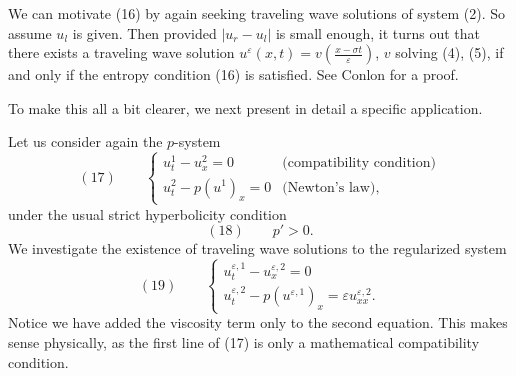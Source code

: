 We can motivate (16) by again seeking traveling wave solutions of system (2). So assume $u_l$ is given. Then provided $|u_r-u_l|$ is small enough, it turns out that there exists a traveling wave solution $u^\varepsilon(x,t) = v\left(\frac{x-\sigma t}{\varepsilon}\right)$, $v$ solving (4), (5), if and only if the entropy condition (16) is satisfied. See Conlon \cite{Conlon1980} for a proof.

To make this all a bit clearer, we next present in detail a specific application.

\begin{example}
\label{ex:traveling-waves-p-system}
Let us consider again the $p$-system
$$(17) \qquad \begin{cases} u^1_t - u^2_x = 0 & \text{(compatibility condition)} \\ u^2_t - p(u^1)_x = 0 & \text{(Newton's law)}, \end{cases}$$
under the usual strict hyperbolicity condition
$$(18) \qquad p' > 0.$$
We investigate the existence of traveling wave solutions to the regularized system
$$(19) \qquad \begin{cases} u^{\varepsilon,1}_t - u^{\varepsilon,2}_x = 0 \\ u^{\varepsilon,2}_t - p(u^{\varepsilon,1})_x = \varepsilon u^{\varepsilon,2}_{xx}. \end{cases}$$
Notice we have added the viscosity term only to the second equation. This makes sense physically, as the first line of (17) is only a mathematical compatibility condition.


\end{example}
